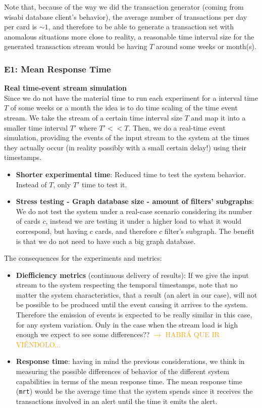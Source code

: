 Note that, because of the way we did the transaction generator (coming from wisabi database client's behavior), the average number of transactions per day per card is $\sim1$, and therefore to be able to generate a transaction set with anomalous situations more close to reality, a reasonable time interval size for the generated transaction stream would be having $T$ around some weeks or month(s).

\subsubsection{E1: Mean Response Time}

\textbf{Real time-event stream simulation\\}
Since we do not have the material time to run each experiment for a interval time $T$ of some weeks or a month the idea is to do time scaling of the time event stream. We take the stream of a certain time interval size $T$ and map it into a smaller time interval
$T'$ where $T' << T$. Then, we do a real-time event simulation, providing the events of the input stream to the system at the times they actually occur (in reality possibly with a small certain delay!) using their timestamps.

\begin{itemize}
  \item \textbf{Shorter experimental time}: Reduced time to test the system behavior. Instead of $T$, only $T'$ time to test it. 
  \item \textbf{Stress testing - Graph database size - amount of filters' subgraphs}: We do not test the system under a real-case scenario considering its number of cards $c$, instead we are testing it under a higher load to what it would correspond, but having $c$ cards, and therefore $c$ filter's subgraph. The benefit is that we do not need to have such a big graph database.
\end{itemize}

The consequences for the experiments and metrics:

\begin{itemize}
  \item \textbf{Diefficiency metrics} (continuous delivery of results): If we give the input stream to the system respecting the temporal timestamps, note that no matter the system characteristics, that a result (an alert in our case), will not be possible to be produced until the event causing it arrives to the system. Therefore the emission of events is expected to be really similar in this case, for any system variation. Only in the case when the stream load is high enough we expect to see some differences?? \textcolor{orange}{$\rightarrow$ HABRÁ QUE IR VIÉNDOLO...}
  \item \textbf{Response time}: having in mind the previous considerations, we think in measuring the possible differences of behavior of the different system capabilities in terms of the mean response time. The mean response time (\texttt{mrt}) would be the average time that the system spends since it receives the transactions involved in an alert until the time it emits the alert.
\end{itemize}


